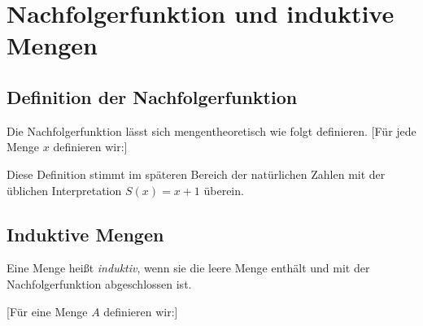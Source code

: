 \documentclass[main.tex]{subfiles}
\begin{document}
\section{Nachfolgerfunktion und induktive Mengen}

\subsection{Definition der Nachfolgerfunktion}

Die Nachfolgerfunktion lässt sich mengentheoretisch wie folgt definieren.  
[Für jede Menge \(x\) definieren wir:]
\begin{remark}
Diese Definition stimmt im späteren Bereich der natürlichen Zahlen mit der üblichen Interpretation \(S(x) = x+1\) überein. 

\end{remark}
\subsection{Induktive Mengen}

Eine Menge heißt \emph{induktiv}, wenn sie die leere Menge enthält und mit der Nachfolgerfunktion abgeschlossen ist.

[Für eine Menge \(A\) definieren wir:]


\begin{tabproof}
\end{tabproof}

\begin{tabproof}
\end{tabproof}
\end{document}
